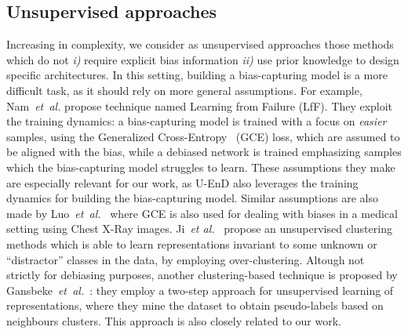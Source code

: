 \subsection{Unsupervised approaches}
Increasing in complexity, we consider as unsupervised approaches those methods which do not \emph{i)} require explicit bias information \emph{ii)} use prior knowledge to design specific architectures. 
In this setting, building a bias-capturing model is a more difficult task, as it should rely on more general assumptions. 
For example, Nam~\emph{et~al.} propose technique named Learning from Failure (LfF). They exploit the training dynamics: a bias-capturing model is trained with a focus on \emph{easier} samples, using the Generalized Cross-Entropy~\cite{zhang2018gce} (GCE) loss, which are assumed to be aligned with the bias, while a debiased network is trained emphasizing samples which the bias-capturing model struggles to learn. These assumptions they make are especially relevant for our work, as U-EnD also leverages the training dynamics for building the bias-capturing model. %
Similar assumptions are also made by Luo~\emph{et~al.}~\cite{luo2022pseudo} where GCE is also used for dealing with biases in a medical setting using Chest X-Ray images.
Ji~\emph{et al.}~\cite{ji2019invariant} propose an unsupervised clustering methods which is able to learn representations invariant to some unknown or ``distractor'' classes in the data, by employing over-clustering. Altough not strictly for debiasing purposes, another clustering-based technique is proposed by Gansbeke~\emph{et~al.}~\cite{van2020scan}: they employ a two-step approach for unsupervised learning of representations, where they mine the dataset to obtain pseudo-labels based on neighbours clusters. This approach is also closely related to our work.

